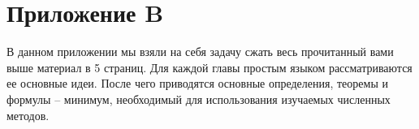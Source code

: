 

\newpage
{}
\pagestyle{empty}
\chapter*{Приложение B}
\vspace{0.5cm}

В данном приложении мы взяли на себя задачу сжать весь прочитанный вами выше материал в 5 страниц. Для каждой главы простым языком рассматриваются ее основные идеи. После чего приводятся основные определения, теоремы и формулы -- минимум, необходимый для использования изучаемых численных методов.







